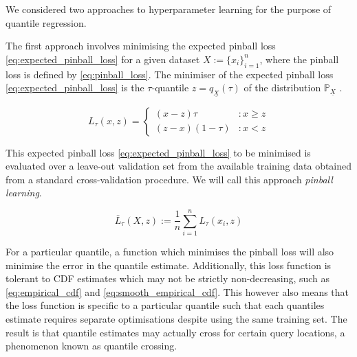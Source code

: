 \documentclass[twoside]{article} \usepackage{aistats2017}
\theoremstyle{definition}
\theoremstyle{remark}
\newcommand{\rv}[1]{\underline{#1}}
\newcommand{\ds}[1]{{#1}}
\begin{document}
	We considered two approaches to hyperparameter learning for the purpose of quantile regression.
	
	
	The first approach involves minimising the expected pinball loss \eqref{eq:expected_pinball_loss} for a given dataset $\ds{X} := \{x_{i}\}_{i = 1}^{n}$, where the pinball loss is defined by \eqref{eq:pinball_loss}. The minimiser of the expected pinball loss \eqref{eq:expected_pinball_loss} is the $\tau$-quantile $z = q_{\rv{X}}(\tau)$ of the distribution $\mathbb{P}_{\rv{X}}$ \citep{Koenker1978}.
	
	\begin{equation}
		L_{\tau}(x, z) = \left\{ \begin{array}{lr}
			(x - z) \tau & : x \geq z \\
			(z - x) (1 - \tau) & : x < z
		\end{array} \right.
	\label{eq:pinball_loss}
	\end{equation}
	
	This expected pinball loss \eqref{eq:expected_pinball_loss} to be minimised is evaluated over a leave-out validation set from the available training data obtained from a standard cross-validation procedure. We will call this approach \textit{pinball learning}.
	
	\begin{equation}
		\bar{L}_{\tau}(\ds{X}, z) := \frac{1}{n} \sum_{i = 1}^{n} L_{\tau}(x_{i}, z)
	\label{eq:expected_pinball_loss}
	\end{equation}
	
	For a particular quantile, a function which minimises the pinball loss will also minimise the
	error in the quantile estimate. Additionally, this loss function is tolerant to CDF estimates which may not be strictly non-decreasing, such as \eqref{eq:empirical_cdf} and \eqref{eq:smooth_empirical_cdf}. This however also means that the loss function is specific to a particular quantile such that each quantiles estimate requires separate optimisations despite using the same training set. The result is that quantile estimates may actually cross for certain query locations, a phenomenon known as quantile crossing.
	
\end{document}
